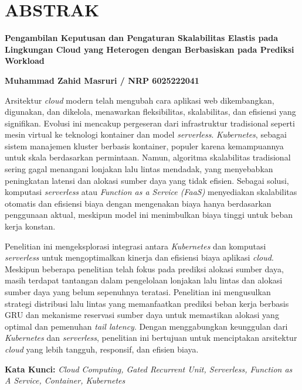 
\clearpage


\section*{\large \centering \MakeUppercase 
    {Abstrak}
}

\begin{center}

    \justifying \normalsize

    \textbf{Pengambilan Keputusan dan Pengaturan Skalabilitas Elastis pada Lingkungan Cloud yang Heterogen dengan Berbasiskan pada Prediksi Workload}

    \vspace{0.5cm}

    \textbf{Muhammad Zahid Masruri / NRP 6025222041}

    \vspace{0.5cm}

    Arsitektur \emph{cloud} modern telah mengubah cara aplikasi web dikembangkan, digunakan, dan dikelola, menawarkan fleksibilitas, skalabilitas, dan efisiensi yang signifikan. Evolusi ini mencakup pergeseran dari infrastruktur tradisional seperti mesin virtual ke teknologi kontainer dan model \emph{serverless}. \emph{Kubernetes}, sebagai sistem manajemen kluster berbasis kontainer, populer karena kemampuannya untuk skala berdasarkan permintaan. Namun, algoritma skalabilitas tradisional sering gagal menangani lonjakan lalu lintas mendadak, yang menyebabkan peningkatan latensi dan alokasi sumber daya yang tidak efisien. Sebagai solusi, komputasi \emph{serverless} atau \emph{Function as a Service (FaaS)} menyediakan skalabilitas otomatis dan efisiensi biaya dengan mengenakan biaya hanya berdasarkan penggunaan aktual, meskipun model ini menimbulkan biaya tinggi untuk beban kerja konstan.

    Penelitian ini mengeksplorasi integrasi antara \emph{Kubernetes} dan komputasi \emph{serverless} untuk mengoptimalkan kinerja dan efisiensi biaya aplikasi \emph{cloud}. Meskipun beberapa penelitian telah fokus pada prediksi alokasi sumber daya, masih terdapat tantangan dalam pengelolaan lonjakan lalu lintas dan alokasi sumber daya yang belum sepenuhnya teratasi. Penelitian ini mengusulkan strategi distribusi lalu lintas yang memanfaatkan prediksi beban kerja berbasis GRU dan mekanisme reservasi sumber daya untuk memastikan alokasi yang optimal dan pemenuhan \emph{tail latency}. Dengan menggabungkan keunggulan dari \emph{Kubernetes} dan \emph{serverless}, penelitian ini bertujuan untuk menciptakan arsitektur \emph{cloud} yang lebih tangguh, responsif, dan efisien biaya.

    \vspace{0.5cm}

    \textbf{Kata Kunci:} \emph{Cloud Computing, Gated Recurrent Unit, Serverless, Function as A Service, Container, Kubernetes}

\end{center}

\clearpage
